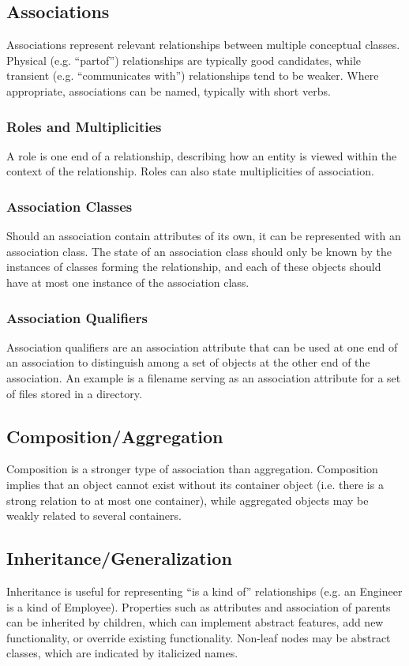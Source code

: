 \documentclass[12pt,titlepage]{article}
\begin{document}
    \subsection{Associations}
      Associations represent relevant relationships between multiple conceptual classes. Physical (e.g. ``partof'') relationships are typically good candidates, while transient
      (e.g. ``communicates with'') relationships tend to be weaker. Where appropriate, associations can be named, typically with short verbs.

      \subsubsection{Roles and Multiplicities}
        A role is one end of a relationship, describing how an entity is viewed within the context of the relationship. Roles can also state multiplicities of association.

      \subsubsection{Association Classes}
        Should an association contain attributes of its own, it can be represented with an association class. The state of an association class should only be known by the instances
        of classes forming the relationship, and each of these objects should have at most one instance of the association class.

      \subsubsection{Association Qualifiers}
        Association qualifiers are an association attribute that can be used at one end of an association to distinguish among a set of objects at the other end of the association.
        An example is a filename serving as an association attribute for a set of files stored in a directory.

    \subsection{Composition/Aggregation}
      Composition is a stronger type of association than aggregation. Composition implies that an object cannot exist without its container object (i.e. there is a strong relation to
      at most one container), while aggregated objects may be weakly related to several containers.

    \subsection{Inheritance/Generalization}
      Inheritance is useful for representing ``is a kind of'' relationships (e.g. an Engineer is a kind of Employee). Properties such as attributes and association of parents can be
      inherited by children, which can implement abstract features, add new functionality, or override existing functionality. Non-leaf nodes may be abstract classes, which are
      indicated by italicized names.
\end{document}
